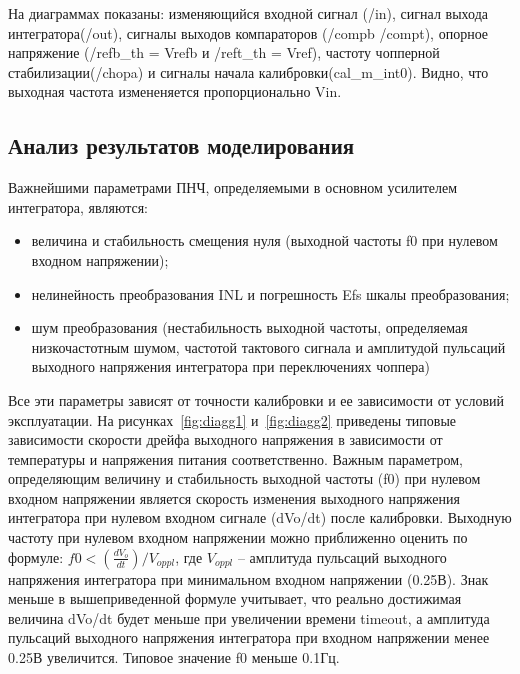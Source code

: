 \documentclass[a4paper,12pt,oneside]{scrartcl}
\begin{document}
На диаграммах показаны: изменяющийся входной сигнал (/in), сигнал выхода интегратора(/out), сигналы выходов компараторов (/compb /compt), опорное напряжение 
(/refb\_th = Vrefb и /reft\_th = Vref), частоту чопперной стабилизации(/chopa) и сигналы начала калибровки(cal\_m\_int0). Видно, что выходная частота измененяется пропорционально Vin. 









\subsection{Анализ результатов моделирования}

Важнейшими параметрами ПНЧ, определяемыми в основном усилителем интегратора, являются:
\begin{itemize}
    \item величина и стабильность смещения нуля (выходной частоты f0 при нулевом входном напряжении);
    \item нелинейность преобразования INL и погрешность Efs шкалы преобразования;
    \item шум преобразования (нестабильность выходной частоты, определяемая низкочастотным шумом, частотой тактового сигнала и амплитудой пульсаций выходного напряжения интегратора при переключениях чоппера)
\end{itemize}

Все эти параметры зависят от точности калибровки и ее зависимости от условий эксплуатации. На рисунках~\ref{fig:diagg1} и~\ref{fig:diagg2} приведены типовые зависимости скорости дрейфа выходного напряжения в зависимости от температуры и напряжения питания соответственно. Важным параметром, определяющим величину и стабильность выходной частоты (f0) при нулевом входном напряжении является скорость изменения выходного напряжения интегратора при нулевом входном сигнале (dVo/dt) после калибровки. Выходную частоту при нулевом входном напряжении можно приближенно оценить по формуле: $f0 < (\frac{dV_{o}}{dt}) / V_{oppl}$, где $V_{oppl}$ – амплитуда пульсаций выходного напряжения интегратора при минимальном входном напряжении (0.25В). Знак меньше в вышеприведенной формуле учитывает, что реально достижимая величина dVo/dt будет меньше при увеличении времени timeout, а амплитуда пульсаций выходного напряжения интегратора при входном напряжении менее 0.25В увеличится. Типовое значение  f0 меньше 0.1Гц.
\end{document}
